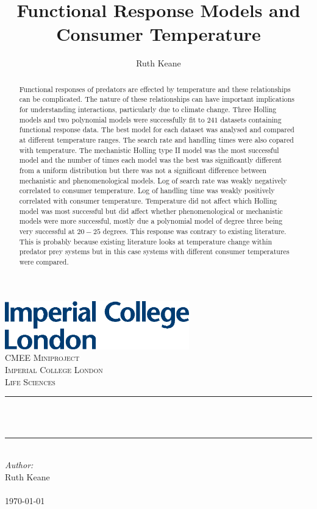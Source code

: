 \documentclass{article}
\newcommand{\HRule}{\rule{\linewidth}{1mm}}
\begin{document}
\title{Functional Response Models and Consumer Temperature}%
\author{Ruth Keane}

\begin{titlepage}
\includegraphics[width=8cm]{logo.eps}\\[1cm] 
\center 
\textsc{\LARGE CMEE Miniproject}\\[1.5cm] 
\textsc{\Large Imperial College London}\\[0.5cm]
\textsc{\large Life Sciences}\\[0.5cm] 
\makeatletter
\HRule \\[0.4cm]
{ \huge \bfseries \@title}\\[0.4cm] %
\HRule \\[1.5cm]
\makeatother
\Large \emph{Author:}\\
Ruth Keane \\[3cm] %
\\
{\large \today}\\[2cm] %
\vfill %
\clearpage
\end{titlepage}
\tableofcontents
\newpage
\linenumbers
\begin{abstract}
Functional responses of predators are effected by temperature and these relationships can be complicated. The nature of these relationships can have important implications for understanding interactions, particularly due to climate change. Three Holling models and two polynomial models were successfully fit to $241$ datasets containing functional response data. The best model for each dataset was analysed and compared at different temperature ranges. The search rate and handling times were also copared with temperature. The mechanistic Holling type II model was the most successful model  and the number of times each model was the best was significantly different from a uniform distribution but there was not a significant difference between mechanistic and phenomenological models. Log of search rate was weakly negatively correlated  to consumer temperature. Log of handling time was weakly positively correlated with consumer temperature. Temperature did not affect which Holling model was most successful but did affect whether phenomenological or mechanistic models were more successful, mostly due a polynomial model of degree three being very successful at $20-25$ degrees. This response was contrary to existing literature. This is probably because existing literature looks at temperature change within predator prey systems but in this case systems with different consumer temperatures were compared. 
\end{abstract}
\end{document}
